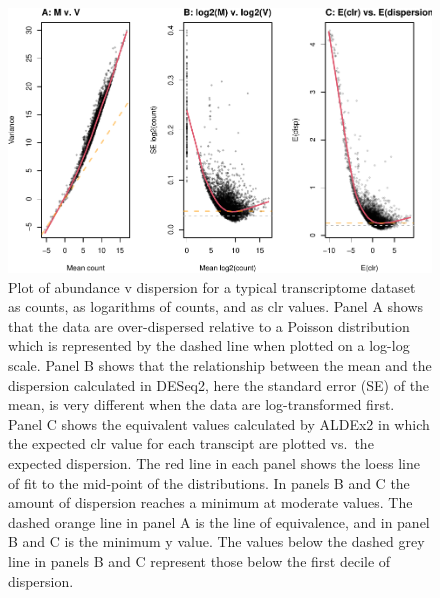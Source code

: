 \documentclass[
]{article}
\begin{document}
\begin{figure}
\centering
\includegraphics{go3_files/figure-latex/dispersion-1.pdf}
\caption{Plot of abundance v dispersion for a typical transcriptome
dataset as counts, as logarithms of counts, and as clr values. Panel A
shows that the data are over-dispersed relative to a Poisson
distribution which is represented by the dashed line when plotted on a
log-log scale. Panel B shows that the relationship between the mean and
the dispersion calculated in DESeq2, here the standard error (SE) of the
mean, is very different when the data are log-transformed first. Panel C
shows the equivalent values calculated by ALDEx2 in which the expected
clr value for each transcipt are plotted vs.~the expected dispersion.
The red line in each panel shows the loess line of fit to the mid-point
of the distributions. In panels B and C the amount of dispersion reaches
a minimum at moderate values. The dashed orange line in panel A is the
line of equivalence, and in panel B and C is the minimum y value. The
values below the dashed grey line in panels B and C represent those
below the first decile of dispersion.}
\end{figure}
\end{document}
